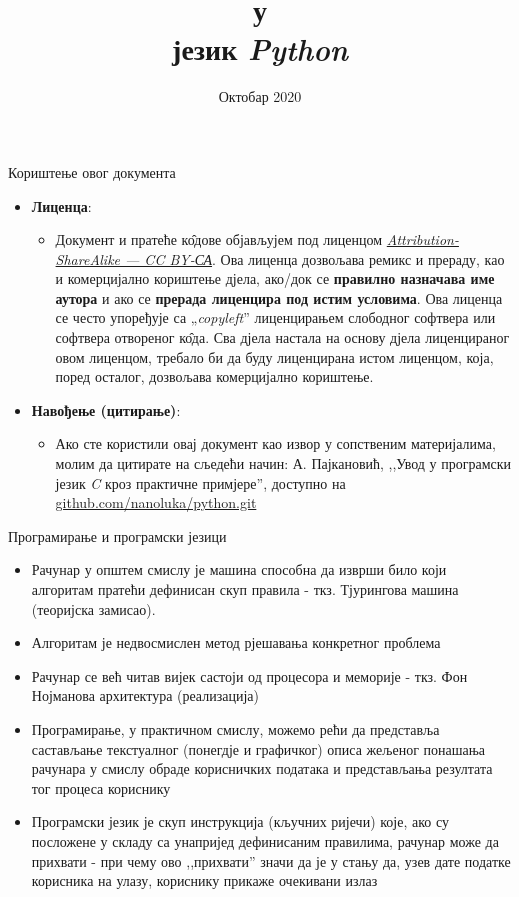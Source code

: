 \documentclass{beamer}
\title[Програмски језик \textit{Python} - основи]{\color{black}\smallУвод у \\\color{violet}\normalsizeПрограмски језик \textit{Python}}
\institute{\texttt{nanoluka.org}\\
YouTube.com/nanoluka\\
instagram.com/nanolukaorg\\
twitter.com/nanolukaorg\\
github.com/nanoluka\\
\texttt{nanolukaorg@gmail.com}}
\date{\color{violet}Октобар 2020}
\begin{document}
\maketitle

\begin{frame}{Кориштење овог документа}
\begin{itemize}
    \item \textbf{Лиценца}: 
    \begin{itemize}
        \item Документ и пратеће к\^{о}дове објављујем под лиценцом \color{violet}\href{https://creativecommons.org/licenses/by-sa/4.0//legalcode}{\textit{Attribution-ShareAlike — CC BY-СА}}\color{black}. Ова лиценца дозвољава ремикс и прераду, као и комерцијално кориштење дјела, ако/док се \textbf{правилно назначава име аутора} и ако се \textbf{прерада лиценцира под истим условима}. Ова лиценца се често упоређује са „\textit{copyleft}” лиценцирањем слободног софтвера или софтвера отвореног к\^{о}да. Сва дјела настала на основу дјела лиценцираног овом лиценцом, требало би да буду лиценцирана истом лиценцом, која, поред осталог, дозвољава комерцијално кориштење.
    \end{itemize}
    \item \textbf{Навођење (цитирање)}: 
    \begin{itemize}
        \item Ако сте користили овај документ као извор у сопственим материјалима, молим да цитирате на сљедећи начин: А. Пајкановић, ,,Увод у програмски језик \textit{C} кроз практичне примјере'', доступно на \color{violet}\href{github.com/nanoluka/python.git}{github.com/nanoluka/python.git}
    \end{itemize}
\end{itemize}
\end{frame}



\begin{frame}{Програмирање и програмски језици}
\begin{itemize}
    \item Рачунар у општем смислу је машина способна да изврши било који алгоритам пратећи дефинисан скуп правила - ткз. Тјурингова машина (теоријска замисао).
    \item Алгоритам је недвосмислен метод рјешавања конкретног проблема
    \item Рачунар се већ читав вијек састоји од процесора и меморије - ткз. Фон Нојманова архитектура (реализација)
    \item Програмирање, у практичном смислу, можемо рећи да представља састављање текстуалног (понегдје и графичког) описа жељеног понашања рачунара у смислу обраде корисничких података и представљања резултата тог процеса кориснику
    \item Програмски језик је скуп инструкција (кључних ријечи) које, ако су посложене у складу са унапријед дефинисаним правилима, рачунар може да прихвати - при чему ово ,,прихвати'' значи да је у стању да, узев дате податке корисника на улазу, кориснику прикаже очекивани излаз
\end{itemize}
\end{frame}
\end{document}
